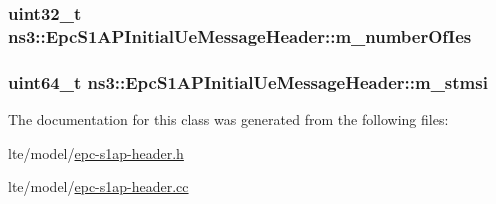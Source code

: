 \subsubsection[{\texorpdfstring{m\+\_\+number\+Of\+Ies}{m_numberOfIes}}]{\setlength{\rightskip}{0pt plus 5cm}uint32\+\_\+t ns3\+::\+Epc\+S1\+A\+P\+Initial\+Ue\+Message\+Header\+::m\+\_\+number\+Of\+Ies\hspace{0.3cm}{\ttfamily [private]}}\hypertarget{classns3_1_1EpcS1APInitialUeMessageHeader_ac1ee41c38988ec5fbadaf31e3a906ae0}{}\label{classns3_1_1EpcS1APInitialUeMessageHeader_ac1ee41c38988ec5fbadaf31e3a906ae0}
\subsubsection[{\texorpdfstring{m\+\_\+stmsi}{m_stmsi}}]{\setlength{\rightskip}{0pt plus 5cm}uint64\+\_\+t ns3\+::\+Epc\+S1\+A\+P\+Initial\+Ue\+Message\+Header\+::m\+\_\+stmsi\hspace{0.3cm}{\ttfamily [private]}}\hypertarget{classns3_1_1EpcS1APInitialUeMessageHeader_a95613bbcb4e243a00cb6972296d19067}{}\label{classns3_1_1EpcS1APInitialUeMessageHeader_a95613bbcb4e243a00cb6972296d19067}


The documentation for this class was generated from the following files\+:\begin{DoxyCompactItemize}
\item 
lte/model/\hyperlink{epc-s1ap-header_8h}{epc-\/s1ap-\/header.\+h}\item 
lte/model/\hyperlink{epc-s1ap-header_8cc}{epc-\/s1ap-\/header.\+cc}\end{DoxyCompactItemize}
